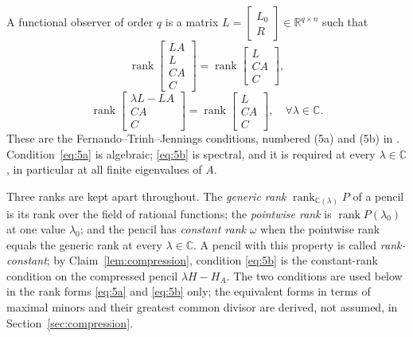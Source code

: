 \documentclass[journal]{IEEEtran}
\theoremstyle{plainn}
\theoremstyle{remark}
\begin{document}
A functional observer of order $q$ is a matrix $L=\begin{bmatrix}L_0 \\ R\end{bmatrix}\in\mathbb R^{q\times n}$ such
that
\begin{equation}\label{eq:5a}
\operatorname{rank}\begin{bmatrix}LA\\ L\\ CA\\ C\end{bmatrix}
=\operatorname{rank}\begin{bmatrix}L\\ CA\\ C\end{bmatrix},
\end{equation}
\begin{equation}\label{eq:5b}
\operatorname{rank}\begin{bmatrix}\lambda L-LA\\ CA\\ C\end{bmatrix}
=\operatorname{rank}\begin{bmatrix}L\\ CA\\ C\end{bmatrix},
\quad \forall\lambda\in\mathbb C.
\end{equation}
These are the Fernando--Trinh--Jennings conditions, numbered (5a) and (5b) in
\cite{fer10}. Condition~\eqref{eq:5a} is algebraic; \eqref{eq:5b} is spectral, and it is
required at every $\lambda\in\mathbb C$, in particular at all finite eigenvalues of $A$.

Three ranks are kept apart throughout. The \emph{generic rank}
$\operatorname{rank}_{\mathbb C(\lambda)}P$ of a pencil is its rank over the field of rational
functions; the \emph{pointwise rank} is $\operatorname{rank}P(\lambda_0)$ at one value $\lambda_0$;
and the pencil has \emph{constant rank} $\omega$ when the pointwise rank equals the generic rank at
every $\lambda\in\mathbb C$. A pencil with this property is called \emph{rank-constant}; by
Claim~\ref{lem:compression}, condition \eqref{eq:5b} is the constant-rank condition on the compressed
pencil $\lambda H-H_A$.
The two conditions are used below in the rank forms \eqref{eq:5a} and \eqref{eq:5b} only; the
equivalent forms in terms of maximal minors and their greatest common divisor are derived, not
assumed, in Section~\ref{sec:compression}.
\end{document}
